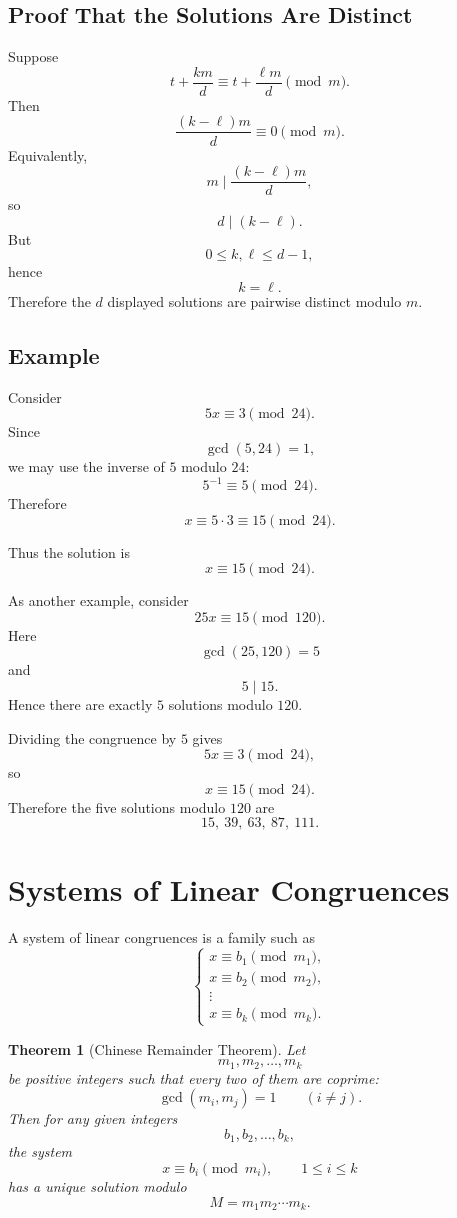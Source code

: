 \documentclass[11pt]{article}
\newtheorem{theorem}{Theorem}[section]
\theoremstyle{remark}
\DeclareMathOperator{\gcdop}{gcd}
\begin{document}
\subsection{Proof That the Solutions Are Distinct}

Suppose
\[
    t+\frac{km}{d}
    \equiv
    t+\frac{\ell m}{d}
    \pmod m.
\]
Then
\[
    \frac{(k-\ell)m}{d}\equiv0\pmod m.
\]
Equivalently,
\[
    m\mid\frac{(k-\ell)m}{d},
\]
so
\[
    d\mid(k-\ell).
\]
But
\[
    0\le k,\ell\le d-1,
\]
hence
\[
    k=\ell.
\]
Therefore the $d$ displayed solutions are pairwise distinct modulo $m$.

\subsection{Example}

Consider
\[
    5x\equiv3\pmod{24}.
\]
Since
\[
    \gcdop(5,24)=1,
\]
we may use the inverse of $5$ modulo $24$:
\[
    5^{-1}\equiv5\pmod{24}.
\]
Therefore
\[
    x\equiv5\cdot3
    \equiv15\pmod{24}.
\]

Thus the solution is
\[
    \boxed{x\equiv15\pmod{24}.}
\]

As another example, consider
\[
    25x\equiv15\pmod{120}.
\]
Here
\[
    \gcdop(25,120)=5
\]
and
\[
    5\mid15.
\]
Hence there are exactly $5$ solutions modulo $120$.

Dividing the congruence by $5$ gives
\[
    5x\equiv3\pmod{24},
\]
so
\[
    x\equiv15\pmod{24}.
\]
Therefore the five solutions modulo $120$ are
\[
    \boxed{
    15,\ 39,\ 63,\ 87,\ 111.
    }
\]

\section{Systems of Linear Congruences}

A system of linear congruences is a family such as
\[
    \begin{cases}
        x\equiv b_1\pmod{m_1},\\
        x\equiv b_2\pmod{m_2},\\
        \vdots\\
        x\equiv b_k\pmod{m_k}.
    \end{cases}
\]

\begin{theorem}[Chinese Remainder Theorem]
Let
\[
    m_1,m_2,\ldots,m_k
\]
be positive integers such that every two of them are coprime:
\[
    \gcdop(m_i,m_j)=1
    \qquad(i\neq j).
\]
Then for any given integers
\[
    b_1,b_2,\ldots,b_k,
\]
the system
\[
    \boxed{
    x\equiv b_i\pmod{m_i},
    \qquad
    1\le i\le k
    }
\]
has a unique solution modulo
\[
    M=m_1m_2\cdots m_k.
    \]
\end{theorem}
\end{document}
